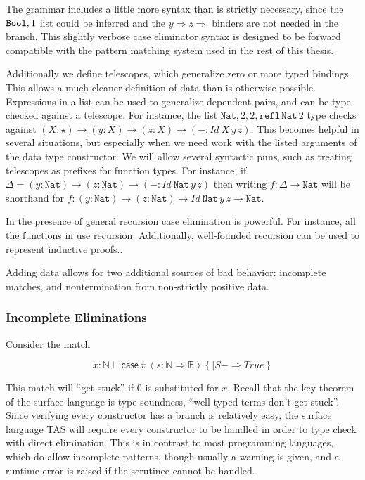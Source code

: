 The grammar includes a little more syntax than is strictly necessary, since the $\mathtt{Bool}{},1$ list could be inferred and the $y\Rightarrow z\Rightarrow$ binders are not needed in the branch.
This slightly verbose case eliminator syntax is designed to be forward compatible with the pattern matching system used in the rest of this thesis. 

Additionally we define telescopes, which generalize zero or more typed bindings.
This allows a much cleaner definition of data than is otherwise possible.
Expressions in a list can be used to generalize dependent pairs, and can be type checked against a telescope.
For instance, the list $\mathtt{Nat},2,2,\mathtt{refl}\,\mathtt{Nat}\,2$ type checks against $\left(X:\star\right)\rightarrow\left(y:X\right)\rightarrow\left(z:X\right)\rightarrow\left(-:Id\ X\,y\,z\right)$.
This becomes helpful in several situations, but especially when we need work with the listed arguments of the data type constructor.
We will allow several syntactic puns, such as treating telescopes as prefixes for function types.
For instance, 
  if $\Delta=\left(y:\mathtt{Nat}\right)\rightarrow\left(z:\mathtt{Nat}\right)\rightarrow\left(-:Id\ \mathtt{Nat}\,y\,z\right)$
  then writing $f:\Delta\rightarrow\mathtt{Nat}$
  will be shorthand for $f:\left(y:\mathtt{Nat}\right)\rightarrow\left(z:\mathtt{Nat}\right)\rightarrow Id\ \mathtt{Nat}\,y\,z\rightarrow\mathtt{Nat}$.


In the presence of general recursion case elimination is powerful.
For instance, all the functions in  use recursion.
Additionally, well-founded recursion can be used to represent inductive proofs..


Adding data allows for two additional sources of bad behavior: incomplete matches, and nontermination from non-strictly positive data. 

\subsubsection{Incomplete Eliminations}

Consider the match 

\[
x:\mathbb{N}\vdash\mathsf{case}\,x\,\left\langle s:\mathbb{N}\Rightarrow\mathbb{B}\right\rangle \left\{ |S-\Rightarrow True\right\} 
\]

This match will ``get stuck'' if $0$ is substituted for $x$.
Recall that the key theorem of the surface language is type soundness, ``well typed terms don't get stuck''.
Since verifying every constructor has a branch is relatively easy, the surface language \ac{TAS} will require every constructor to be handled in order to type check with direct elimination.
This is in contrast to most programming languages, which do allow incomplete patterns, though usually a warning is given, and a runtime error is raised if the scrutinee cannot be handled.

